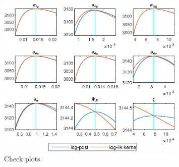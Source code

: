  
\begin{figure}[H]
\centering 
\includegraphics[width=0.80\textwidth]{BRS_imp_mobility/graphs/BRS_imp_mobility_CheckPlots1}
\caption{Check plots.}\label{Fig:CheckPlots:1}
\end{figure}
 
